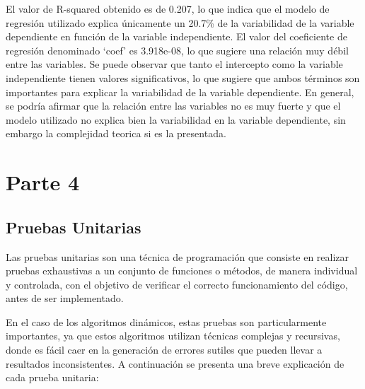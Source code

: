 \documentclass[11pt]{article}
\begin{document}
El valor de R-squared obtenido es de 0.207, lo que indica que el modelo
de regresión utilizado explica únicamente un 20.7\% de la variabilidad
de la variable dependiente en función de la variable independiente. El
valor del coeficiente de regresión denominado `coef' es 3.918e-08, lo
que sugiere una relación muy débil entre las variables. Se puede
observar que tanto el intercepto como la variable independiente tienen
valores significativos, lo que sugiere que ambos términos son
importantes para explicar la variabilidad de la variable dependiente. En
general, se podría afirmar que la relación entre las variables no es muy
fuerte y que el modelo utilizado no explica bien la variabilidad en la
variable dependiente, sin embargo la complejidad teorica si es la
presentada.

\pagebreak
\hypertarget{parte-4}{%
\section{Parte 4}\label{parte-4}}

\hypertarget{pruebas-unitarias}{%
\subsection{Pruebas Unitarias}\label{pruebas-unitarias}}

Las pruebas unitarias son una técnica de programación que consiste en
realizar pruebas exhaustivas a un conjunto de funciones o métodos, de
manera individual y controlada, con el objetivo de verificar el correcto
funcionamiento del código, antes de ser implementado.

En el caso de los algoritmos dinámicos, estas pruebas son
particularmente importantes, ya que estos algoritmos utilizan técnicas
complejas y recursivas, donde es fácil caer en la generación de errores
sutiles que pueden llevar a resultados inconsistentes. A continuación se
presenta una breve explicación de cada prueba unitaria:
\end{document}
